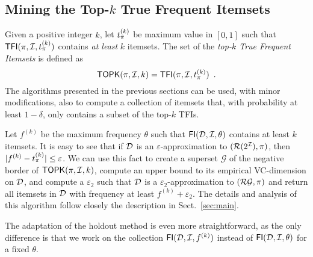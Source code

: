 \subsection{Mining the Top-$k$ True Frequent Itemsets}\label{sect:topk}

Given a positive integer $k$, let $t_\pi^{(k)}$ be maximum value in $[0,1]$ such
that $\mathsf{TFI}(\pi,{\cal I},t_\pi^{(k)})$ contains \emph{at least} $k$ itemsets. The set
of the \emph{top-$k$ True Frequent Itemsets} is defined as
\[
	\mathsf{TOPK}(\pi,{\cal I},k)=\mathsf{TFI}(\pi,{\cal I},t_\pi^{(k)})\enspace.
\]
The algorithms presented in the previous sections can be used, with minor
modifications, also to compute a collection of itemsets that, with probability
at least $1-\delta$, only contains a subset of the top-$k$ TFIs.

Let $f^{(k)}$ be the maximum frequency $\theta$ such that $\mathsf{FI}({\cal D},{\cal I},\theta)$
contains at least $k$ itemsets. It is easy to see that if ${\cal D}$ is an
$\varepsilon$-approximation to $(\mathcal{R}(2^{\cal I}),\pi)$, then
$|f^{(k)}-t_\pi^{(k)}|\le\varepsilon$. We can use this fact to create a superset
$\mathcal{G}$ of the negative border of $\mathsf{TOPK}(\pi,{\cal I},k)$, compute an upper
bound to its empirical VC-dimension on ${\cal D}$, and compute a $\varepsilon_2$ such
that ${\cal D}$ is a $\varepsilon_2$-approximation to $(\mathcal{R}{\mathcal{G}},\pi)$
and return all itemsets in ${\cal D}$ with frequency at least $f^{(k)}+\varepsilon_2$.
The details and analysis of this algorithm follow closely the description in
Sect.~\ref{sec:main}.

The adaptation of the holdout method is even more straightforward, as the only
difference is that we work on the collection $\mathsf{FI}({\cal D},{\cal I},f^{(k)})$ instead of
$\mathsf{FI}({\cal D},{\cal I},\theta)$ for a fixed $\theta$.
